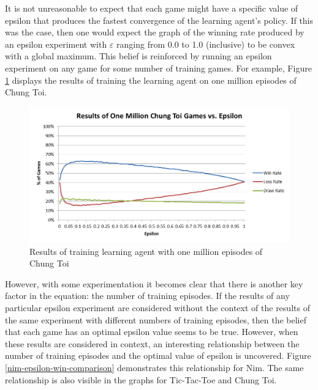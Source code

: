 \documentclass[11pt,a4paper]{report}
\begin{document}
It is not unreasonable to expect that each game might have a specific value of epsilon that produces the fastest convergence of the learning agent's policy. If this was the case, then one would expect the graph of the winning rate produced by an epsilon experiment with $\varepsilon$ ranging from 0.0 to 1.0 (inclusive) to be convex with a global maximum. This belief is reinforced by running an epsilon experiment on any game for some number of training games. For example, Figure \ref{chung-toi-epsilon-1M-graph} displays the results of training the learning agent on one million episodes of Chung Toi.

\begin{figure}[htbp]
	\begin{center}
		\includegraphics[width=125mm]{ChungToi_EpsilonResults_1MGames.png}
		\caption{Results of training learning agent with one million episodes of Chung Toi}
		\label{chung-toi-epsilon-1M-graph}
	\end{center}
\end{figure}

However, with some experimentation it becomes clear that there is another key factor in the equation: the number of training episodes. If the results of any particular epsilon experiment are considered without the context of the results of the same experiment with different numbers of training episodes, then the belief that each game has an optimal epsilon value seems to be true. However, when these results are considered in context, an interesting relationship between the number of training episodes and the optimal value of epsilon is uncovered. Figure \ref{nim-epsilon-win-comparison} demonstrates this relationship for Nim. The same relationship is also visible in the graphs for Tic-Tac-Toe and Chung Toi.
\end{document}
